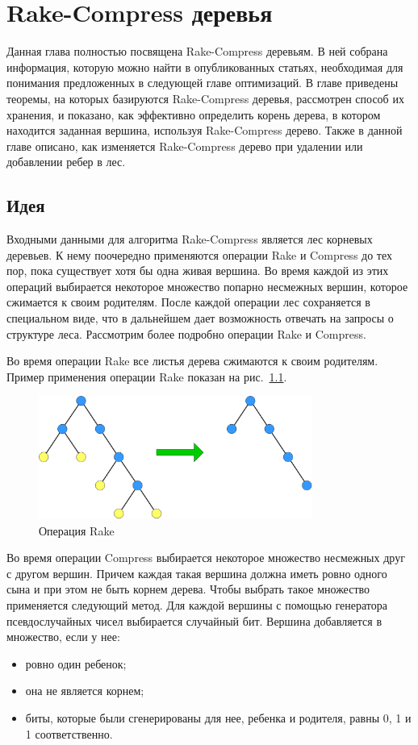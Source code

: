 
\chapter{Rake-Compress деревья}

Данная глава полностью посвящена Rake-Compress деревьям. 
В ней собрана информация, которую можно найти в опубликованных статьях, необходимая для понимания предложенных в следующей главе оптимизаций.
В главе приведены теоремы, на которых базируются Rake-Compress деревья, 
рассмотрен способ их хранения, 
и показано, как эффективно определить корень дерева, в котором находится заданная вершина, используя Rake-Compress дерево.
Также в данной главе описано, как изменяется Rake-Compress дерево при удалении или добавлении ребер в лес.

\FloatBarrier
\section{Идея}

Входными данными для алгоритма Rake-Compress является лес корневых деревьев. К нему поочередно применяются операции Rake и Compress до тех пор, пока существует хотя бы одна живая вершина. 
Во время каждой из этих операций выбирается некоторое множество попарно несмежных вершин, которое сжимается к своим родителям. 
После каждой операции лес сохраняется в специальном виде, что в дальнейшем дает возможность отвечать на запросы о структуре леса. Рассмотрим более подробно операции Rake и Compress.

Во время операции Rake все листья дерева сжимаются к своим родителям. Пример применения операции Rake показан на рис.~\ref{pic:rake}.

\begin{figure}[h]
\centering
\includegraphics[width=0.8\textwidth]{pics/rake.png}
\caption{Операция Rake}
\label{pic:rake}
\end{figure}

Во время операции Compress выбирается некоторое множество несмежных друг с другом вершин.
Причем каждая такая вершина должна иметь ровно одного сына и при этом не быть корнем дерева. Чтобы выбрать такое множество применяется следующий метод.
Для каждой вершины с помощью генератора псевдослучайных чисел выбирается случайный бит. Вершина добавляется в множество, если у нее:
\begin{itemize}
\item ровно один ребенок;
\item она не является корнем;
\item биты, которые были сгенерированы для нее, ребенка и родителя, равны 0, 1 и 1 соответственно. 
\end{itemize}

